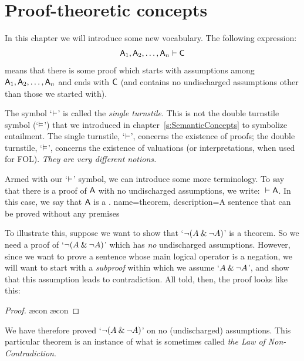 \chapter{Proof-theoretic concepts}\label{s:ProofTheoreticConcepts}

In this chapter we will introduce some new vocabulary. The following expression:
$$\mathsf{A}_1, \mathsf{A}_2, \ldots, \mathsf{A}_n \vdash \mathsf{C}$$
means that there is some proof which starts with assumptions among $\mathsf{A}_1, \mathsf{A}_2, \ldots, \mathsf{A}_n$ and ends with $\mathsf{C}$ (and contains no undischarged assumptions other than those we started with).  

The symbol `$\vdash$' is called the \emph{single turnstile}. This is not the {double turnstile} symbol (`$\vDash$') that we introduced in chapter~\ref{s:SemanticConcepts} to symbolize entailment. The single turnstile, `$\vdash$', concerns the existence of proofs; the double turnstile, `$\vDash$', concerns the existence of valuations (or interpretations, when used for FOL). \emph{They are very different notions.}

Armed with our `$\vdash$' symbol, we can introduce some more terminology. To say that there is a proof of $\mathsf{A}$ with no undischarged assumptions, we write: ${} \vdash \mathsf{A}$. In this case, we say that $\mathsf{A}$ is a .
{
name=theorem,
description={A sentence that can be proved without any premises}
}

        To illustrate this, suppose we want to show that `${\neg} (A \mathbin{\&} {\neg} A)$' is a theorem.  So we need a proof of `${\neg}(A \mathbin{\&} {\neg} A)$' which has \emph{no} undischarged assumptions. However, since we want to prove a sentence whose main logical operator is a negation, we will want to start with a \emph{subproof} within which we assume `$A \mathbin{\&} {\neg} A$', and show that this assumption leads to contradiction. All told, then, the proof looks like this:
	\begin{proof}
		\open
			\ae{con}
			\ae{con}
		\close
	\end{proof}
We have therefore proved `${\neg} (A \mathbin{\&} {\neg} A)$' on no (undischarged) assumptions. This particular theorem is an instance of what is sometimes called \emph{the Law of Non-Contradiction}.

